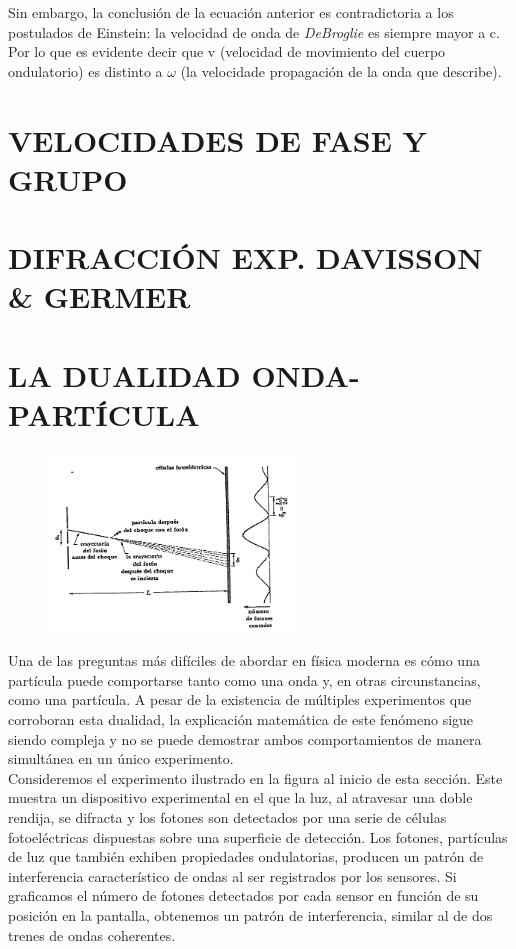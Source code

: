 \documentclass[a4paper]{article}
\begin{document}
    \indent Sin embargo, la conclusión de la ecuación anterior es contradictoria a los postulados de Einstein: la velocidad de onda de \textit{DeBroglie} es siempre mayor a c. Por lo que es evidente decir que v (velocidad de movimiento del cuerpo ondulatorio) es distinto a $\omega$ (la velocidade propagación de la onda que describe). \\

\newpage
\noindent
\thispagestyle{fancy}

\section{VELOCIDADES DE FASE Y GRUPO}

\section{DIFRACCIÓN \text{-} EXP. DAVISSON \& GERMER}

\section{LA DUALIDAD ONDA-PARTÍCULA}

    \begin{figure}[h!]
        \centering
        \includegraphics[width = 6.5cm]{../expDualidadOP.png}
    \end{figure}

    \indent Una de las preguntas más difíciles de abordar en física moderna es cómo una partícula puede comportarse tanto como una onda y, en otras circunstancias, como una partícula. A pesar de la existencia de múltiples experimentos que corroboran esta dualidad, la explicación matemática de este fenómeno sigue siendo compleja y no se puede demostrar ambos comportamientos de manera simultánea en un único experimento.\\ 

    \indent Consideremos el experimento ilustrado en la figura al inicio de esta sección. Este muestra un dispositivo experimental en el que la luz, al atravesar una doble rendija, se difracta y los fotones son detectados por una serie de células fotoeléctricas dispuestas sobre una superficie de detección. Los fotones, partículas de luz que también exhiben propiedades ondulatorias, producen un patrón de interferencia característico de ondas al ser registrados por los sensores. Si graficamos el número de fotones detectados por cada sensor en función de su posición en la pantalla, obtenemos un patrón de interferencia, similar al de dos trenes de ondas coherentes.\\
\end{document}
